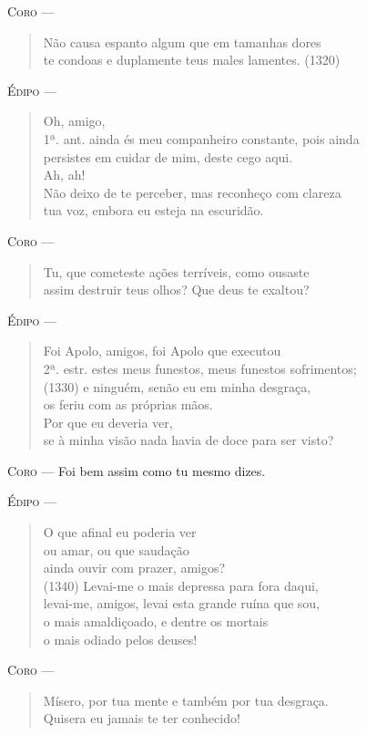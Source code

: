 \textsc{Coro} --- \begin{verse}Não causa espanto algum que em tamanhas dores\\
te condoas e duplamente teus males lamentes. (1320)
\end{verse}

\textsc{Édipo} --- \begin{verse}Oh, amigo,\\ 1ª. ant.
ainda és meu companheiro constante, pois ainda\\
persistes em cuidar de mim, deste cego aqui.\\
Ah, ah!\\
Não deixo de te perceber, mas reconheço com clareza\\
tua voz, embora eu esteja na escuridão.
\end{verse}

\textsc{Coro} --- \begin{verse}Tu, que cometeste ações terríveis, como ousaste\\
assim destruir teus olhos? Que deus te exaltou?
\end{verse}

\textsc{Édipo} --- \begin{verse}Foi Apolo, amigos, foi Apolo que executou\\ 2ª. estr.
estes meus funestos, meus funestos sofrimentos;\\ (1330)
e ninguém, senão eu em minha desgraça,\\
os feriu com as próprias mãos.\\
Por que eu deveria ver,\\
se à minha visão nada havia de doce para ser visto?
\end{verse}

\textsc{Coro} --- Foi bem assim como tu mesmo dizes.

\textsc{Édipo} --- \begin{verse}O que afinal eu poderia ver\\
ou amar, ou que saudação\\
ainda ouvir com prazer, amigos?\\ (1340)
Levai-me o mais depressa para fora daqui,\\
levai-me, amigos, levai esta grande ruína que sou,\\
o mais amaldiçoado, e dentre os mortais\\
o mais odiado pelos deuses!
\end{verse}

\textsc{Coro} --- \begin{verse}Mísero, por tua mente e também por tua desgraça.\\
Quisera eu jamais te ter conhecido!
\end{verse}

